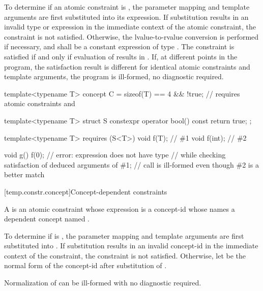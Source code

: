 \pnum
To determine if an atomic constraint is
,
the parameter mapping and template arguments are
first substituted into its expression.
If substitution results in an invalid type or expression
in the immediate context of the atomic constraint,
the constraint is not satisfied.
Otherwise, the lvalue-to-rvalue conversion
is performed if necessary,
and  shall be a constant expression of type .
The constraint is satisfied if and only if evaluation of 
results in .
If, at different points in the program, the satisfaction result is different
for identical atomic constraints and template arguments,
the program is ill-formed, no diagnostic required.
\begin{example}
\begin{codeblock}
template<typename T> concept C =
  sizeof(T) == 4 && !true;      // requires atomic constraints  and 

template<typename T> struct S {
  constexpr operator bool() const { return true; }
};

template<typename T> requires (S<T>{})
void f(T);                      // \#1
void f(int);                    // \#2

void g() {
  f(0);                         // error: expression  does not have type 
}                               // while checking satisfaction of deduced arguments of \#1;
                                // call is ill-formed even though \#2 is a better match
\end{codeblock}
\end{example}

[temp.constr.concept]{Concept-dependent constraints}

\pnum
A   is
an atomic constraint whose expression is a concept-id  whose
 names a dependent concept named .

\pnum
To determine if  is
,
the parameter mapping and template arguments are first
substituted into .
If substitution results in an invalid concept-id in
the immediate context of the constraint,
the constraint is not satisfied.
Otherwise, let  be
the normal form of the concept-id
after substitution of .
\begin{note}
Normalization of  can be ill-formed with no diagnostic required.
\end{note}

